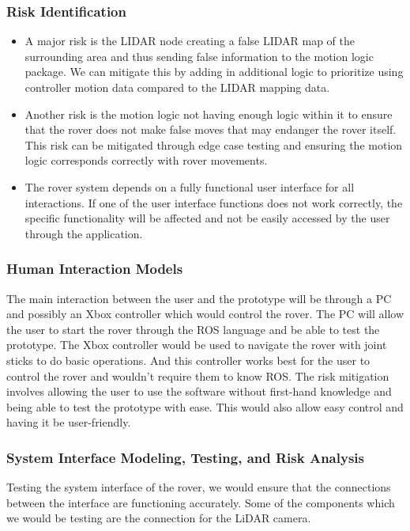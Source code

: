 \documentclass[a4paper, 10pt]{article}
\begin{document}
		\subsubsection*{Risk Identification} 
			\begin{itemize}
				\item
				A major risk is the LIDAR node creating a false LIDAR map of the surrounding area and thus sending false information to the motion logic package. We can mitigate this by adding in additional logic to prioritize using controller motion data compared to the LIDAR mapping data. 

				\item
				Another risk is the motion logic not having enough logic within it to ensure that the rover does not make false moves that may endanger the rover itself. This risk can be mitigated through edge case testing and ensuring the motion logic corresponds correctly with rover movements. 

				\item
				The rover system depends on a fully functional user interface for all interactions. If one of the user interface functions does not work correctly, the specific functionality will be affected and not be easily accessed by the user through the application. 
			\end{itemize}
 		
 		\subsubsection{Human Interaction Models}
		The main interaction between the user and the prototype will be through a PC and possibly an Xbox controller which would control the rover. The PC will allow the user to start the rover through the ROS language and be able to test the prototype. The Xbox controller would be used to navigate the rover with joint sticks to do basic operations. And this controller works best for the user to control the rover and wouldn't require them to know ROS. The risk mitigation involves allowing the user to use the software without first-hand knowledge and being able to test the prototype with ease. This would also allow easy control and having it be user-friendly.

		\subsubsection{System Interface Modeling, Testing, and Risk Analysis}
		Testing the system interface of the rover, we would ensure that the connections between the interface are functioning accurately. Some of the components which we would be testing are the connection for the LiDAR camera. 
\end{document}
